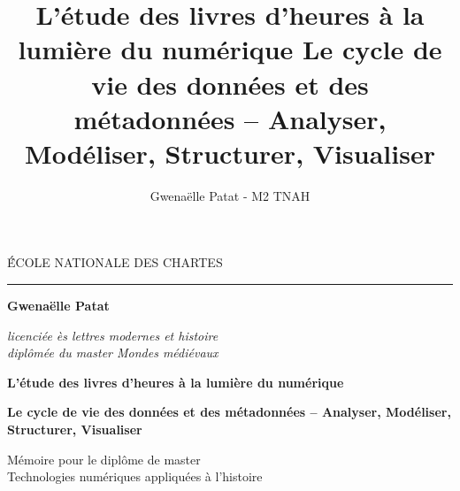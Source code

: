 \documentclass[a4paper,12pt,twoside]{book}
\author{Gwenaëlle Patat - M2 TNAH}
\title{L’étude des livres d’heures à la lumière du numérique
Le cycle de vie des données et des métadonnées – Analyser, Modéliser, Structurer, Visualiser}
\begin{document}
	\frontmatter
	\begin{titlepage}
		\begin{center}
			
			\bigskip
			
			\begin{large}
				\'ÉCOLE NATIONALE DES CHARTES
			\end{large}
			\begin{center}\rule{2cm}{0.02cm}\end{center}
			
			\bigskip
			\bigskip
			\bigskip
			\begin{Large}
				\textbf{Gwenaëlle Patat}\\
			\end{Large}
			\begin{normalsize} \textit{licenciée ès lettres modernes et histoire}\\
				\textit{diplômée du master \og{}Mondes médiévaux\fg{}}
			\end{normalsize}
			
			\bigskip
			\bigskip
			\bigskip
			
			\begin{Huge}
				\textbf{L’étude des livres d’heures à la lumière du numérique}\\
			\end{Huge}
			\bigskip
			\bigskip
			\begin{LARGE}
				\textbf{Le cycle de vie des données et des métadonnées – Analyser, Modéliser, Structurer, Visualiser}\\
			\end{LARGE}
			
			\bigskip
			\bigskip
			\bigskip
			\begin{large}
			\end{large}
			\vfill
			
			\begin{large}
				Mémoire 
				pour le diplôme de master \\
				\og{} Technologies numériques appliquées à l'histoire \fg{} \\
			\end{large}
			
		\end{center}
	\end{titlepage}
	
	\thispagestyle{empty}	
	\cleardoublepage
	
\end{document}
